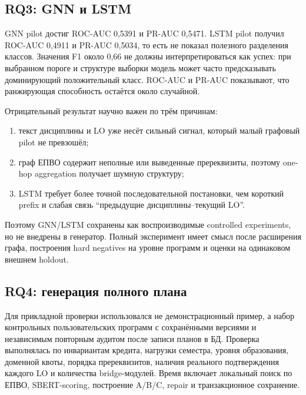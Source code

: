 \documentclass[twoside,11pt]{article}
\begin{document}
\subsection{RQ3: GNN и LSTM}

GNN pilot достиг ROC-AUC 0,5391 и PR-AUC 0,5471. LSTM pilot получил ROC-AUC 0,4911 и PR-AUC 0,5034, то есть не показал полезного разделения классов. Значения F1 около 0,66 не должны интерпретироваться как успех: при выбранном пороге и структуре выборки модель может часто предсказывать доминирующий положительный класс. ROC-AUC и PR-AUC показывают, что ранжирующая способность остаётся около случайной.

Отрицательный результат научно важен по трём причинам:
\begin{enumerate}
  \item текст дисциплины и LO уже несёт сильный сигнал, который малый графовый pilot не превзошёл;
  \item граф ЕПВО содержит неполные или выведенные пререквизиты, поэтому one-hop aggregation получает шумную структуру;
  \item LSTM требует более точной последовательной постановки, чем короткий prefix и слабая связь ``предыдущие дисциплины--текущий LO''.
\end{enumerate}
Поэтому GNN/LSTM сохранены как воспроизводимые controlled experiments, но не внедрены в генератор. Полный эксперимент имеет смысл после расширения графа, построения hard negatives на уровне программ и оценки на одинаковом внешнем holdout.

\subsection{RQ4: генерация полного плана}

Для прикладной проверки использовался не демонстрационный пример, а набор контрольных пользовательских программ с сохранёнными версиями и независимым повторным аудитом после записи планов в БД. Проверка выполнялась по инвариантам кредита, нагрузки семестра, уровня образования, доменной квоты, порядка пререквизитов, наличия реального подтверждения каждого LO и количества bridge-модулей. Время включает локальный поиск по ЕПВО, SBERT-scoring, построение A/B/C, repair и транзакционное сохранение.
\end{document}

